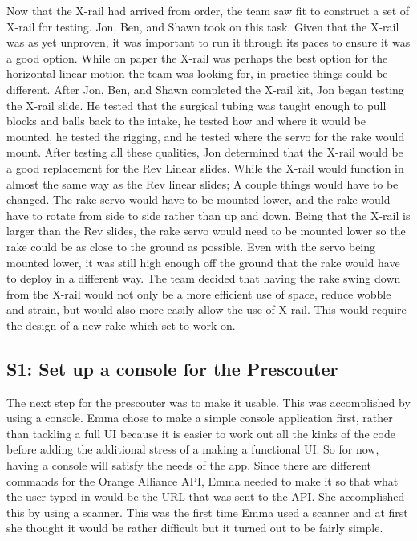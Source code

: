 \documentclass{article}
\begin{document}
Now that the X-rail had arrived from order, the team saw fit to construct a set of X-rail for testing. Jon, Ben, and Shawn took on this task. Given that the X-rail was as yet unproven, it was important to run it through its paces to ensure it was a good option. While on paper the X-rail was perhaps the best option for the horizontal linear motion the team was looking for, in practice things could be different. After Jon, Ben, and Shawn completed the X-rail kit, Jon began testing the X-rail slide. He tested that the surgical tubing was taught enough to pull blocks and balls back to the intake, he tested how and where it would be mounted, he tested the rigging, and he tested where the servo for the rake would mount. After testing all these qualities, Jon determined that the X-rail would be a good replacement for the Rev Linear slides. While the X-rail would function in almost the same way as the Rev linear slides; A couple things would have to be changed. The rake servo would have to be mounted lower, and the rake would have to rotate from side to side rather than up and down. Being that the X-rail is larger than the Rev slides, the rake servo would need to be mounted lower so the rake could be as close to the ground as possible. Even with the servo being mounted lower, it was still high enough off the ground that the rake would have to deploy in a different way. The team decided that having the rake swing down from the X-rail would not only be a more efficient use of space, reduce wobble and strain, but would also more easily allow the use of X-rail. This would require the design of a new rake which set to work on. 



\subsection{S1: Set up a console for the Prescouter}

The next step for the prescouter was to make it usable. This was accomplished by using a console. Emma chose to make a simple console application first, rather than tackling a full UI because it is easier to work out all the kinks of the code before adding the additional stress of a making a functional UI. So for now, having a console will satisfy the needs of the app. Since there are different commands for the Orange Alliance API, Emma needed to make it so that what the user typed in would be the URL that was sent to the API. She accomplished this by using a scanner. This was the first time Emma used a scanner and at first she thought it would be rather difficult but it turned out to be fairly simple. 
\end{document}
